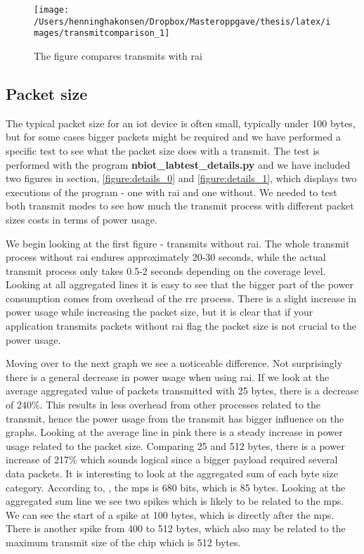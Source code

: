 \documentclass[USenglish]{ifimaster}  %
\begin{document}
\begin{figure}[H]
  \centering\texttt{[image: /Users/henninghakonsen/Dropbox/Masteroppgave/thesis/latex/images/transmitcomparison\_1]}
  \caption[Short-term test - comparison with \acrshort{rai}]{The figure compares transmits with \acrshort{rai}}
  \label{figure:transmit_comparison_1}
\end{figure}

\subsection{Packet size} \label{ssection:packetsize}
The typical packet size for an \acrshort{iot} device is often small, typically under 100 bytes, but for some cases bigger packets might be required and we have performed a specific test to see what the packet size does with a transmit. The test is performed with the program \textbf{nbiot\_labtest\_details.py} and we have included two figures in section, \vref{figure:details_0} and \vref{figure:details_1}, which displays two executions of the program - one with \acrshort{rai} and one without. We needed to test both transmit modes to see how much the transmit process with different packet sizes costs in terms of power usage.

We begin looking at the first figure - transmits without \acrshort{rai}. The whole transmit process without \acrshort{rai} endures approximately 20-30 seconds, while the actual transmit process only takes 0.5-2 seconds depending on the coverage level. Looking at all aggregated lines it is easy to see that the bigger part of the power consumption comes from overhead of the \acrshort{rrc} process. There is a slight increase in power usage while increasing the packet size, but it is clear that if your application transmits packets without \acrshort{rai} flag the packet size is not crucial to the power usage.

Moving over to the next graph we see a noticeable difference. Not surprisingly there is a general decrease in power usage when using \acrshort{rai}. If we look at the average aggregated value of packets transmitted with 25 bytes, there is a decrease of 240\%. This results in less overhead from other processes related to the transmit, hence the power usage from the transmit has bigger influence on the graphs. Looking at the average line in pink there is a steady increase in power usage related to the packet size. Comparing 25 and 512 bytes, there is a power increase of 217\% which sounds logical since a bigger payload required several data packets. It is interesting to look at the aggregated sum of each byte size category. According to, \cite{online:rohde}, the \acrfull{mps} is 680 bits, which is 85 bytes. Looking at the aggregated sum line we see two spikes which is likely to be related to the \acrshort{mps}. We can see the start of a spike at 100 bytes, which is directly after the \acrshort{mps}. There is another spike from 400 to 512 bytes, which also may be related to the maximum transmit size of the chip which is 512 bytes.
\end{document}
